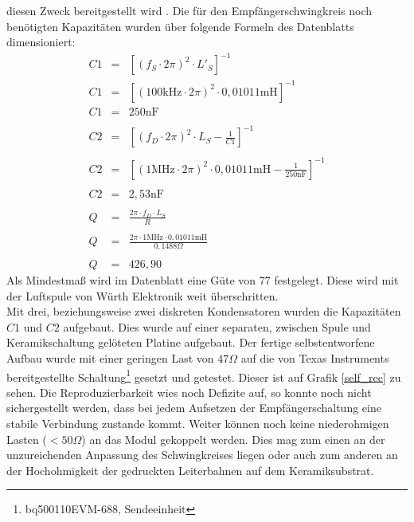 \documentclass[12pt]{scrreprt} %
\begin{document}
diesen Zweck bereitgestellt wird \citep{Spule}. Die für den Empfängerschwingkreis noch benötigten Kapazitäten wurden über folgende Formeln des Datenblatts \citep{BQ51013} dimensioniert: 
\begin{eqnarray}
C1&=&\left[\left(f_S \cdot 2\pi\right)^2 \cdot L'_S\right]^{-1}\\
C1&=&\left[\left(100\text{kHz} \cdot 2\pi\right)^2 \cdot 0,01011\text{mH}\right]^{-1}\\
C1&=&250\text{nF}\\
\nonumber\\
C2&=&\left[\left(f_D \cdot 2\pi\right)^2 \cdot L_S-\frac 1{C1}\right]^{-1}\\
\nonumber\\
C2&=&\left[\left(1\text{MHz} \cdot 2\pi\right)^2 \cdot 0,01011\text{mH}-\frac 1{250\text{nF}}\right]^{-1}\\
\nonumber\\
C2&=&2,53\text{nF}\\
\nonumber\\
Q&=&\frac{2\pi \cdot f_D \cdot L_S}{R}\\
\nonumber\\
Q&=&\frac{2\pi \cdot 1\text{MHz} \cdot 0,01011\text{mH}}{0,1488 \Omega}\\
\nonumber\\
Q&=&426,90
\end{eqnarray}
Als Mindestmaß wird im Datenblatt \citep[siehe S.23]{BQ51013} eine Güte von 77 festgelegt. Diese wird mit der Luftspule von Würth Elektronik weit überschritten.\\
Mit drei, beziehungsweise zwei diskreten Kondensatoren wurden die Kapazitäten $C1$ und $C2$ aufgebaut. Dies wurde auf einer separaten, zwischen Spule und Keramikschaltung gelöteten Platine aufgebaut. Der fertige selbstentworfene Aufbau wurde mit einer geringen Last von $47 \Omega$ auf die von Texas Instruments bereitgestellte Schaltung\footnote{bq500110EVM-688, Sendeeinheit} gesetzt und getestet. Dieser ist auf Grafik \vref{self_rec} zu sehen. Die Reproduzierbarkeit wies noch Defizite auf, so konnte noch nicht sichergestellt werden, dass bei jedem Aufsetzen der Empfängerschaltung eine stabile Verbindung zustande kommt. Weiter können noch keine niederohmigen Lasten ($<50 \Omega$) an das Modul gekoppelt werden. Dies mag zum einen an der unzureichenden Anpassung des Schwingkreises liegen oder auch zum anderen an der Hochohmigkeit der gedruckten Leiterbahnen auf dem Keramiksubstrat. 
\end{document}
